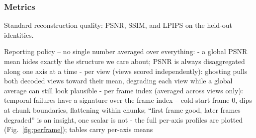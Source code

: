 \subsubsection{Metrics}


Standard reconstruction quality: PSNR, SSIM, and LPIPS \cite{zhang2018unreasonable} on the held-out identities.

Reporting policy -- no single number averaged over everything:
- a global PSNR mean hides exactly the structure we care about; PSNR is always disaggregated along one axis at a time
- per view (views scored independently): ghosting pulls both decoded views toward their mean, degrading each view while a global average can still look plausible
- per frame index (averaged across views only): temporal failures have a signature over the frame index -- cold-start frame 0, dips at chunk boundaries, flattening within chunks; ``first frame good, later frames degraded'' is an insight, one scalar is not
- the full per-axis profiles are plotted (Fig.~\ref{fig:perframe}); tables carry per-axis means

